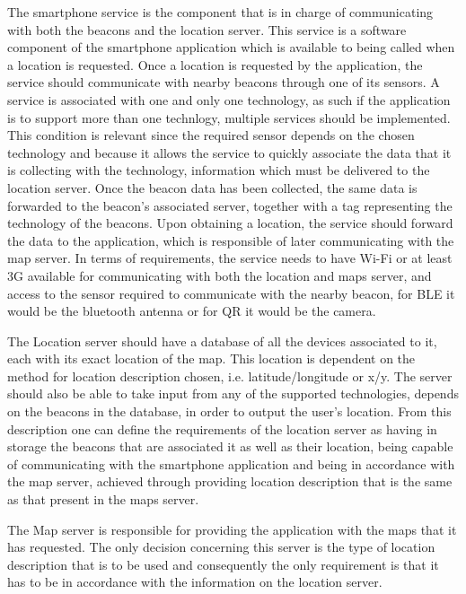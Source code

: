 \documentclass[a4paper]{IEEEtran}
\begin{document}
The smartphone service is the component that is in charge of communicating with both the beacons and the location server. This service is a software component of the smartphone application which is available to being called when a location is requested. Once a location is requested by the application, the service should communicate with nearby beacons through one of its sensors. A service is associated with one and only one technology, as such if the application is to support more than one technlogy, multiple services should be implemented. This condition is relevant since the required sensor depends on the chosen technology and because it allows the service to quickly associate the data that it is collecting with the technology, information which must be delivered to the location server. Once the beacon data has been collected, the same data is forwarded to the beacon's associated server, together with a tag representing the technology of the beacons. Upon obtaining a location, the service should forward the data to the application, which is responsible of later communicating with the map server. In terms of requirements, the service needs to have Wi-Fi or at least 3G available for communicating with both the location and maps server, and access to the sensor required to communicate with the nearby beacon, for BLE it would be the bluetooth antenna or for QR it would be the camera.

The Location server should have a database of all the devices associated to it, each with its exact location of the map. This location is dependent on the method for location description chosen, i.e. latitude/longitude or x/y. The server should also be able to take input from any of the supported technologies, depends on the beacons in the database, in order to output the user's location. From this description one can define the requirements of the location server as having in storage the beacons that are associated it as well as their location, being capable of communicating with the smartphone application and being in accordance with the map server, achieved through providing location description that is the same as that present in the maps server.

The Map server is responsible for providing the application with the maps that it has requested. The only decision concerning this server is the type of location description that is to be used and consequently the only requirement is that it has to be in accordance with the information on the location server.
\end{document}
